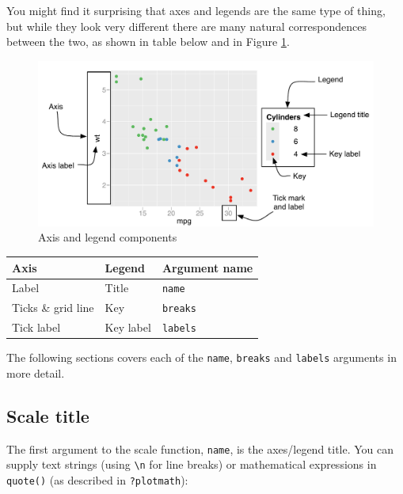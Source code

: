 You might find it surprising that axes and legends are the same type of
thing, but while they look very different there are many natural
correspondences between the two, as shown in table below and in Figure
\ref{fig:guides}.   

\begin{figure}[htbp]
  \centering
  \includegraphics[width=\linewidth]{diagrams/scale-guides.pdf}
  \caption{Axis and legend components}
  \label{fig:guides}
\end{figure}

\begin{longtable}[c]{@{}lll@{}}
\toprule
Axis & Legend & Argument name\tabularnewline
\midrule
\endhead
Label & Title & \texttt{name}\tabularnewline
Ticks \& grid line & Key & \texttt{breaks}\tabularnewline
Tick label & Key label & \texttt{labels}\tabularnewline
\bottomrule
\end{longtable}

The following sections covers each of the \texttt{name}, \texttt{breaks}
and \texttt{labels} arguments in more detail.

\subsection{Scale title}

The first argument to the scale function, \texttt{name}, is the
axes/legend title. You can supply text strings (using
\texttt{\textbackslash{}n} for line breaks) or mathematical expressions
in \texttt{quote()} (as described in \texttt{?plotmath}):
 

\begin{Shaded}
\begin{Highlighting}[]
\StringTok{ }\NormalTok{(} \NormalTok{:}\NormalTok{, } \NormalTok{, } \NormalTok{)}
\StringTok{ }\StringTok{ }\NormalTok{()}
\StringTok{ }\NormalTok{(}\NormalTok{)}
\StringTok{ }\NormalTok{(}\StringTok{ }\StringTok{ }
\end{Highlighting}
\end{Shaded}

